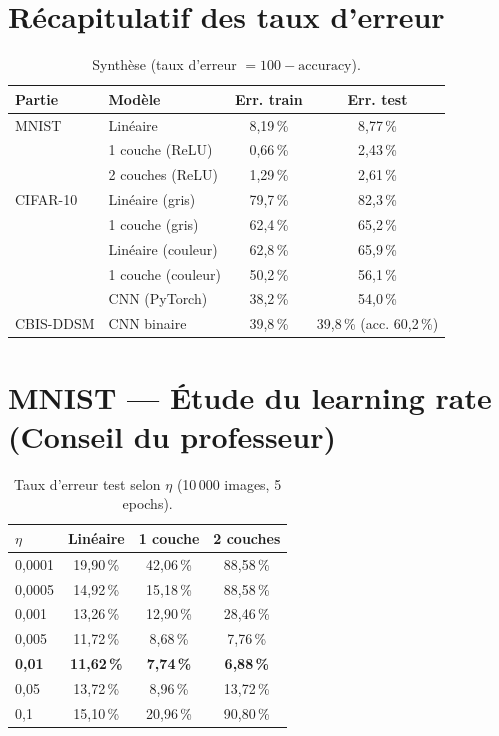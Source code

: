 \documentclass[11pt]{article}
\begin{document}
\section{Récapitulatif des taux d'erreur}
\begin{table}[H]
\centering\small
\begin{tabular}{llcc}
\toprule
Partie & Modèle & Err. train & Err. test \\
\midrule
MNIST & Linéaire & 8,19\,\% & 8,77\,\% \\
 & 1 couche (ReLU) & 0,66\,\% & 2,43\,\% \\
 & 2 couches (ReLU) & 1,29\,\% & 2,61\,\% \\
\midrule
CIFAR-10 & Linéaire (gris) & 79,7\,\% & 82,3\,\% \\
 & 1 couche (gris) & 62,4\,\% & 65,2\,\% \\
 & Linéaire (couleur) & 62,8\,\% & 65,9\,\% \\
 & 1 couche (couleur) & 50,2\,\% & 56,1\,\% \\
 & CNN (PyTorch) & 38,2\,\% & 54,0\,\% \\
\midrule
CBIS-DDSM & CNN binaire & 39,8\,\% & 39,8\,\% (acc. 60,2\,\%) \\
\bottomrule
\end{tabular}
\caption{Synthèse (taux d'erreur $=100-\text{accuracy}$).}
\end{table}

\section{MNIST --- Étude du learning rate (Conseil du professeur)}
\begin{table}[H]
\centering\small
\begin{tabular}{lccc}
\toprule
$\eta$ & Linéaire & 1 couche & 2 couches \\
\midrule
0,0001 & 19,90\,\% & 42,06\,\% & 88,58\,\% \\
0,0005 & 14,92\,\% & 15,18\,\% & 88,58\,\% \\
0,001  & 13,26\,\% & 12,90\,\% & 28,46\,\% \\
0,005  & 11,72\,\% & 8,68\,\% & 7,76\,\% \\
\textbf{0,01} & \textbf{11,62\,\%} & \textbf{7,74\,\%} & \textbf{6,88\,\%} \\
0,05   & 13,72\,\% & 8,96\,\% & 13,72\,\% \\
0,1    & 15,10\,\% & 20,96\,\% & 90,80\,\% \\
\bottomrule
\end{tabular}
\caption{Taux d'erreur test selon $\eta$ (10\,000 images, 5 epochs).}
\label{tab:lr}
\end{table}
\end{document}
